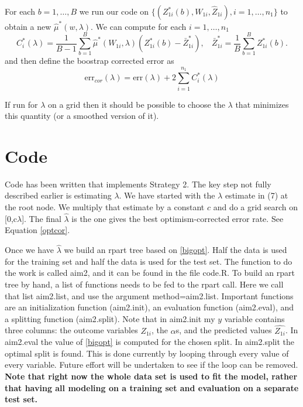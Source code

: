 \documentclass[12pt]{article}
\begin{document}
For each $b = 1,\ldots,B$ we run our code on $\{(Z^*_{1i}(b), W_{1i}, \hat Z_{1i}),
i=1,\ldots,n_1\}$ to obtain a new $\hat \mu^*(w,\lambda)$.  We can
compute for each $i=1,\ldots,n_1$
\[
C^*_i(\lambda) = \frac{1}{B-1} \sum_{b=1}^B \hat \mu^*(W_{1i},\lambda)
(Z^*_{1i}(b) - \bar Z^*_{1i}), 
~~~~\bar Z^*_{1i} = \frac{1}{B} \sum_{b=1}^B Z^*_{1i}(b).
\]
and then define the boostrap corrected error as
\begin{equation}
  \label{optcor}
  \mbox{err}_{cor}(\lambda)  = \mbox{err}(\lambda) + 2 \sum_{i=1}^{n_1} C^*_i(\lambda)
\end{equation}

If run for $\lambda$ on a grid then it should be possible to choose 
the $\lambda$ that minimizes this quantity (or a smoothed version of it).

\section{Code}

Code has been written that implements Strategy 2.  The key step not
fully described earlier is estimating $\lambda$.  We have started with
the $\lambda$ estimate in (7) at the root node.  We multiply that
estimate by a constant $c$ and do a grid search on [0,c$\lambda$].
The final $\hat{\lambda}$ is the one gives the best optimism-corrected
error rate.  See Equation \eqref{optcor}.

Once we have $\hat{\lambda}$ we build an rpart tree based on
\eqref{bigopt}.  Half the data is used for the training set and half
the data is used for the test set.  The function to do the work is
called aim2, and it can be found in the file code.R.  To build an
rpart tree by hand, a list of functions needs to be fed to the rpart
call.  Here we call that list aim2.list, and use the argument
method=aim2.list.  Important functions are an initialization function
(aim2.init), an evaluation function (aim2.eval), and a splitting
function (aim2.split).  Note that in aim2.init my $y$ variable
contains three columns: the outcome variables $Z_{1i}$, the $\alpha$s,
and the predicted values $\widehat{Z_{1i}}$.  In aim2.eval the value
of \eqref{bigopt} is computed for the chosen split.  In aim2.split the
optimal split is found.  This is done currently by looping through
every value of every variable.  Future effort will be undertaken to
see if the loop can be removed.  {\bf Note that right now the whole
  data set is used to fit the model, rather that having all modeling
  on a training set and evaluation on a separate test set.}
\end{document}
